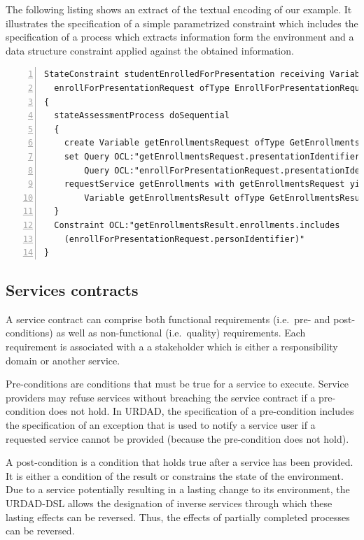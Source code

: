 The following listing shows an extract of the textual encoding of our example. It illustrates the specification of a simple parametrized  constraint which includes the specification of a process which extracts information form the environment and a data structure constraint applied against the obtained information.
\tiny \begin{lstlisting}[numbers=left,escapechar=|]
StateConstraint studentEnrolledForPresentation receiving Variable 
  enrollForPresentationRequest ofType EnrollForPresentationRequest
{
  stateAssessmentProcess doSequential
  {
    create Variable getEnrollmentsRequest ofType GetEnrollmentsRequest
    set Query OCL:"getEnrollmentsRequest.presentationIdentifier" equalTo
        Query OCL:"enrollForPresentationRequest.presentationIdentifier"
    requestService getEnrollments with getEnrollmentsRequest yielding
        Variable getEnrollmentsResult ofType GetEnrollmentsResult
  }
  Constraint OCL:"getEnrollmentsResult.enrollments.includes
    (enrollForPresentationRequest.personIdentifier)"
}
\end{lstlisting}\normalsize


\subsection{Services contracts}

A service contract can comprise both functional requirements (i.e.\ pre- and post-conditions) as well as non-functional (i.e.\ quality) requirements. Each requirement is associated with a a stakeholder which is either a responsibility domain or another service. 

Pre-conditions are conditions that must be true for a service to execute. Service providers may refuse  services without breaching the service contract if a pre-condition does not hold. In URDAD, the specification of a pre-condition includes the specification of an exception that is used to notify a service user if a requested service cannot be provided (because the pre-condition does not hold). 

A post-condition is a condition that holds true after a service has been provided. It is either a condition of the result or constrains the state of the environment. Due to a service potentially resulting in a lasting change to its environment, the URDAD-DSL allows the designation of inverse services through which these lasting effects can be reversed. Thus, the effects of partially completed processes can be reversed.

